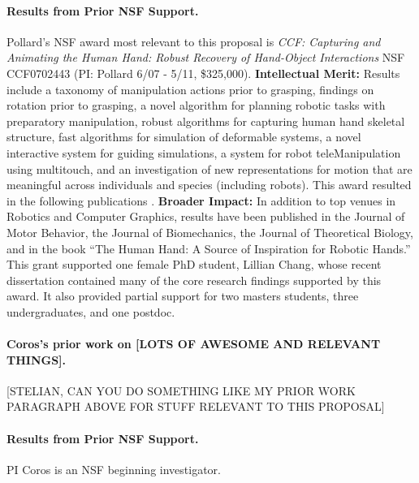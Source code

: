 \paragraph{Results from Prior NSF Support.}
Pollard's NSF award most relevant to this proposal is \emph{CCF: Capturing and Animating the Human Hand: Robust Recovery of Hand-Object Interactions} NSF CCF0702443
(PI:  Pollard  6/07 - 5/11, \$325,000).
{\bf Intellectual Merit:}  Results include a taxonomy of manipulation actions prior to grasping, findings on rotation prior to grasping, a novel algorithm for planning robotic tasks with preparatory manipulation, robust
algorithms for capturing human hand skeletal structure, fast algorithms for simulation of deformable systems, a novel interactive system for guiding
simulations, a system for robot teleManipulation using multitouch, and an investigation of new
representations for motion that are meaningful across 
individuals and species (including robots).  This award resulted in the following
publications
\cite{Toh:2012,Chang:2014,Gatesy:2011,Kappler:2012,Kim:ToG11,Kim:CGA11,Koonjul:ICRA11,Chang:JMB10,Chang:ICRA10,Kappler:Humanoids10,Chang:2009,Chang:twoAxis08,Chang:Humanoids08}.
{\bf Broader Impact:}  In addition to top venues in Robotics and Computer Graphics, results
have been published in the Journal of Motor Behavior, the Journal of
Biomechanics, the Journal of Theoretical Biology, and
in the book ``The Human Hand: A Source of Inspiration for
Robotic Hands.''  This grant supported one female PhD student, Lillian Chang,
whose recent dissertation contained many of the core research findings
supported by this award.  It also provided partial support for two masters students, three undergraduates,
and one postdoc.


\paragraph{Coros's prior work on [LOTS OF AWESOME AND RELEVANT THINGS].} 

[STELIAN, CAN YOU DO SOMETHING LIKE MY PRIOR WORK PARAGRAPH ABOVE FOR STUFF RELEVANT TO THIS PROPOSAL]

\paragraph{Results from Prior NSF Support.}
PI Coros is an NSF beginning investigator.